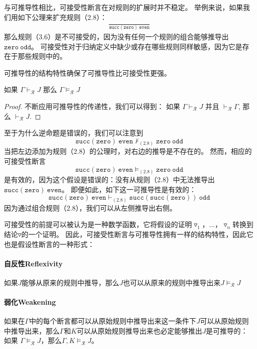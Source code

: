 与可推导性相比，可接受性断言在对规则的扩展时并不稳定。
举例来说，如果我们用如下公理来扩充规则（2.8）：
\begin{equation}
    \begin{aligned}
        \frac{ }{\mathtt{succ}(\mathtt{zero}) \  \mathtt{even}}
    \end{aligned}
\end{equation}
那么规则（3.6）是不可接受的，因为没有任何一个规则的组合能够推导出$\mathtt{zero} \  \mathtt{odd}$。
可接受性对于归纳定义中缺少或存在哪些规则同样敏感，因为它是存在于那些规则中的。

可推导性的结构特性确保了可推导性比可接受性更强。

\begin{theorem}[]
    如果 $\Gamma \vdash_{\mathcal{R}} J$ 那么 $\Gamma \vDash_{\mathcal{R}} J$
\end{theorem}

\begin{proof}
    不断应用可推导性的传递性，我们可以得到：
    如果 $\Gamma \vdash_{\mathcal{R}} J$ 并且 $\vdash_{\mathcal{R}} \Gamma$, 
    那么 $\vdash_{\mathcal{R}} J$.
\end{proof}

至于为什么逆命题是错误的，我们可以注意到
$$\mathtt{succ}(\mathtt{zero}) \ \mathtt{even} \nvdash_{(2.8)} \mathtt{zero} \  \mathtt{odd}$$
当把左边添加为规则（2.8）的公理时，对右边的推导是不存在的。
然而，相应的可接受性断言
$$\mathtt{succ}(\mathtt{zero}) \  \mathtt{even} \vDash_{(2.8)} \mathtt{zero} \ \mathtt{odd}$$
是有效的，因为这个假设是错误的：没有从规则（2.8）中无法推导出$\mathtt{succ}(\mathtt{zero}) \ \mathtt{even}$。
即便如此，如下这一可推导性是有效的：
$$\mathtt{succ}(\mathtt{zero}) \  \mathtt{even} \vdash_{(2.8)} \mathtt{succ}(\mathtt{succ}(\mathtt{zero})) \  \mathtt{odd} $$
因为通过组合规则（2.8），我们可以从左侧推导出右侧。

可接受性的前提可以被认为是一种数学函数，它将假设的证明$ \triangledown_1，\dots，\triangledown_n $转换到结论$ \triangledown $的一个证明。
因此，可接受性断言与可推导性拥有一样的结构特性，因此它也是假设性断言的一种形式：

\paragraph{自反性Reflexivity} 
如果$J$能够从原来的规则中推导，那么$J$也可以从原来的规则中推导出来$J \vDash_{\mathcal{R}} J$

\paragraph{弱化Weakening} 
如果在$ \Gamma $中的每个断言都可以从原始规则中推导出来这一条件下$ J $可以从原始规则中推导出来，那么$ \Gamma $和$ K $可以从原始规则推导出来也必定能够推出$ J $是可推导的：如果 $\Gamma \vDash_{\mathcal{R}} J$，那么$\Gamma,K \vDash_{\mathcal{R}} J$。

